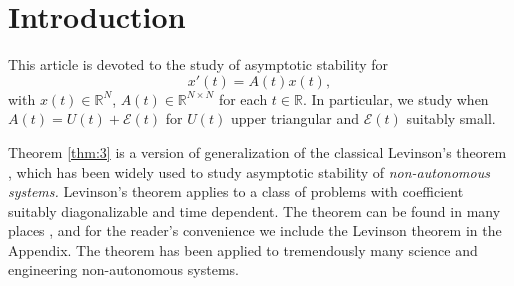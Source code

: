 \documentclass[a4paper,11pt]{article}
\def\blue{\color{blue}}
\newcommand{\E}{\mathcal{E}}
\newcounter{Theorem}
\theoremstyle{remark}
\begin{document}




\section{Introduction} \label{sec:intro}
This article is devoted to the study of asymptotic stability for
\begin{equation}
x'(t) = A(t)x(t), \label{eq:0}
\end{equation}
with $x(t) \in \mathbb{R}^N$, $A(t)\in \mathbb{R}^{N\times N}$ for each $t\in \mathbb{R}$. In particular, we study when $A(t)=U(t) + \E(t)$ for $U(t)$ upper triangular and $\E(t)$ suitably small. 



Theorem \ref{thm:3} is a version of generalization of the classical Levinson's theorem \cite{L48}, which has been widely used to study asymptotic stability of {\it non-autonomous systems.} Levinson's theorem applies to a class of problems with coefficient suitably diagonalizable and time dependent. The theorem can be found in many places \cite{BL15,CL55,L19}, and for the reader’s convenience we include the Levinson theorem in the Appendix. The theorem has been applied to tremendously many science and engineering non-autonomous systems. %
\end{document}
